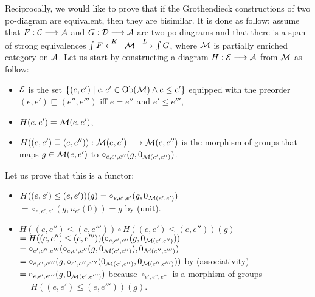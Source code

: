 	Reciprocally, we would like to prove that if the Grothendieck constructions of two po-diagram are equivalent, then they are bisimilar. It is done as follow: assume that $F : \mathcal{C} \longrightarrow \mathcal{A}$ and $G : \mathcal{D} \longrightarrow \mathcal{A}$ are two po-diagrams and that there is a span of strong equivalences $\int F \xleftarrow{~ K ~ } \mathcal{M} \xrightarrow{~ L ~} \int G$, where $\mathcal{M}$ is partially enriched category on $\mathcal{A}$. Let us start by constructing a diagram $H : \mathcal{E} \longrightarrow \mathcal{A}$ from $\mathcal{M}$ as follow:
	\begin{itemize}
		\item $\mathcal{E}$ is the set $\{(e,e')\mid e, e' \in \text{Ob}(\mathcal{M}) \wedge e \leq e'\}$ equipped with the preorder $(e,e') \sqsubseteq (e'',e''')$ iff $e = e''$ and $e' \leq e'''$,
		\item $H(e,e') = \mathcal{M}(e,e')$,
		\item $H((e,e') \sqsubseteq (e,e'')) : \mathcal{M}(e,e') \longrightarrow \mathcal{M}(e,e'')$ is the morphism of groups that maps $g \in \mathcal{M}(e,e')$ to $\circ_{e,e',e''}(g,0_{\mathcal{M}(e',e'')})$.
	\end{itemize}

Let us prove that this is a functor:
\begin{itemize}
	\item $H((e,e') \leq (e,e'))(g) = \circ_{e,e',e'}(g,0_{\mathcal{M}(e',e')}) $\\$=\circ_{e,e',e'}(g,u_{e'}(0)) = g$ by (unit).
	\item $H((e,e'') \leq (e,e''')) \circ H((e,e') \leq (e,e''))(g) $\\$=H((e,e'') \leq (e,e'''))(\circ_{e,e',e''}(g,0_{\mathcal{M}(e',e'')}))$\\$=\circ_{e',e'',e'''}(\circ_{e,e',e''}(g,0_{\mathcal{M}(e',e'')}),0_{\mathcal{M}(e'',e''')}) $\\$=\circ_{e,e',e'''}(g,\circ_{e',e'',e'''}(0_{\mathcal{M}(e',e'')},0_{\mathcal{M}(e'',e''')}))$ by (associativity)\\
	$= \circ_{e,e',e'''}(g,0_{\mathcal{M}(e',e''')})$ because $\circ_{e',e'',e'''}$ is a morphism of groups\\
	$= H((e,e') \leq (e,e'''))(g)$.
\end{itemize}

